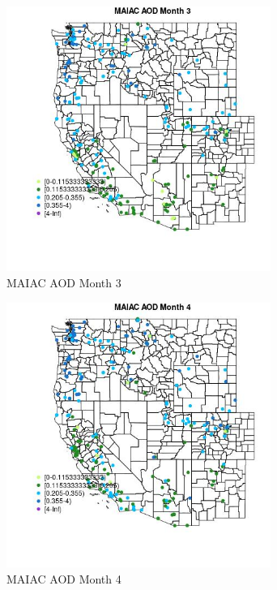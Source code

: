 \begin{figure} 
\centering  
\includegraphics[width=0.77\textwidth]{Code_Outputs/Report_ML_input_PM25_Step4_part_e_de_duplicated_aveswNAs_MapObsMo3MAIAC_AOD.jpg} 
\caption{\label{fig:Report_ML_input_PM25_Step4_part_e_de_duplicated_aveswNAsMapObsMo3MAIAC_AOD}MAIAC AOD Month 3} 
\end{figure} 
 

\clearpage 

\begin{figure} 
\centering  
\includegraphics[width=0.77\textwidth]{Code_Outputs/Report_ML_input_PM25_Step4_part_e_de_duplicated_aveswNAs_MapObsMo4MAIAC_AOD.jpg} 
\caption{\label{fig:Report_ML_input_PM25_Step4_part_e_de_duplicated_aveswNAsMapObsMo4MAIAC_AOD}MAIAC AOD Month 4} 
\end{figure} 
 

